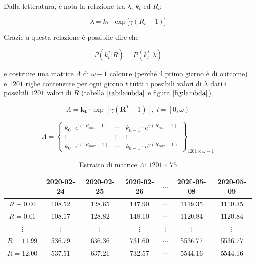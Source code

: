 \documentclass[11pt]{article}
\begin{document}
Dalla letteratura, è nota la relazione tra \(\lambda\), \(k_t\) ed
\(R_t\):

\begin{equation}\label{eq:lambda}
\lambda = k_t \cdot \exp{\big[ \gamma (R_t - 1) \big]}
\end{equation}

Grazie a questa relazione è possibile dire che

\begin{equation}\label{eq:pkr}
P(k_t^*|R) = P(k_t^*|\lambda)
\end{equation}

e costruire una matrice \(\Lambda\) di \(\omega-1\) colonne (perché il
primo giorno è di outcome) e \(1201\) righe contenente per ogni giorno
\(t\) tutti i possibili valori di \(\lambda\) dati i possibili \(1201\)
valori di \(R\) (tabella \(\ref{tab:lambda}\) e figura
\(\ref{fig:lambda}\)).

    \begin{equation}\label{eq:matricelambda}
\Lambda = \mathbf{k_t} \cdot \exp\left[ \gamma ( \mathbf{R}^{T} - 1) \right], \; t=\left[ 0,\omega \right)
\end{equation}

\[ \Lambda = \begin{Bmatrix}
k_0 \cdot e^{\gamma (R_{min} - 1) } & \cdots  & k_{n-1} \cdot e^{\gamma (R_{min} - 1) } \\ 
\vdots & \vdots & \vdots \\ 
k_0 \cdot e^{\gamma (R_{max} - 1) } & \cdots  &  k_{n-1} \cdot e^{\gamma (R_{max} - 1) }  
\end{Bmatrix}_{1201 \times \omega-1} \]

    
\begin{table}
  \begin{center}
    \caption{Estratto di matrice $\Lambda$: $1201 \times 75$}
    \label{tab:lambda}
    \begin{tabular}{c|c|c|c|c|c|c|}
          & 2020-02-24 & 
          2020-02-25 &
          2020-02-26 &
          $\cdots$ & 
          2020-05-08 & 
          2020-05-09 \\
        \toprule
        $R=0.00$ & 108.52 & 128.65 & 147.90 & $\cdots$ & 1119.35 & 1119.35 \\
        \midrule
        $R=0.01$ & 108.67 & 128.82 & 148.10 & $\cdots$ & 1120.84 & 1120.84 \\
        \midrule
        $\vdots$ & $\vdots$ & $\vdots$ & $\vdots$ & $\vdots$ & $\vdots$ & $\vdots$ \\
        \midrule
        $R=11.99$ & 536.79 & 636.36 & 731.60 & $\cdots$ & 5536.77 & 5536.77 \\
        \midrule
        $R=12.00$ & 537.51 & 637.21 & 732.57 & $\cdots$ & 5544.16 & 5544.16 \\
        \bottomrule
    \end{tabular}
  \end{center}
\end{table}
        
\end{document}
